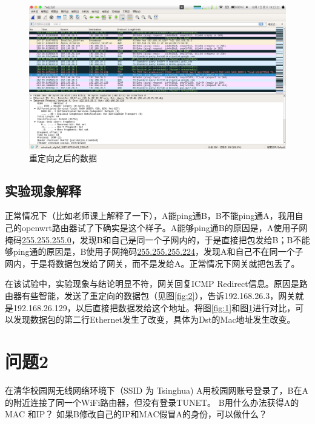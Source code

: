 \documentclass[a4paper]{article}
\begin{document}
\begin{figure}[htp]
\centering
\includegraphics[width=1.0\linewidth]{ping-after.png}
\caption{重定向之后的数据}
\label{fig:3}
\end{figure}

\subsection{实验现象解释}
正常情况下（比如老师课上解释了一下），A能ping通B，B不能ping通A，我用自己的openwrt路由器试了下确实是这个样子。A能够ping通B的原因是，A使用子网掩码\uline{255.255.255.0}，发现B和自己是同一个子网内的，于是直接把包发给B；B不能够ping通的原因是，B使用子网掩码\uline{255.255.255.224}，发现A和自己不在同一个子网内，于是将数据包发给了网关，而不是发给A。正常情况下网关就把包丢了。

在该试验中，实验现象与结论明显不符，网关回复ICMP Redirect信息。原因是路由器有些智能，发送了重定向的数据包（见图\ref{fig:2}），告诉192.168.26.3，网关就是192.168.26.129，以后直接把数据发给这个地址。将图\ref{fig:1}和图\ref{fig:3}进行对比，可以发现数据包的第二行Ethernet发生了改变，具体为Dst的Mac地址发生改变。
\section{问题2}
在清华校园网无线网络环境下（SSID 为 Tsinghua) A用校园网账号登录了，B在A的附近连接了同一个WiFi路由器，但没有登录TUNET。 B用什么办法获得A的MAC 和IP？ 如果B修改自己的IP和MAC假冒A的身份，可以做什么？
\end{document}
